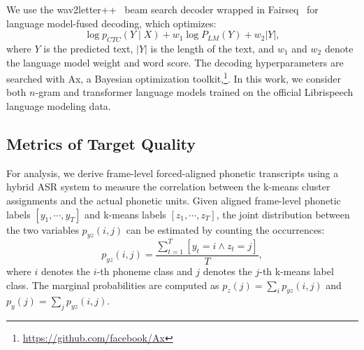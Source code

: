 We use the wav2letter++~\cite{pratap2018wav2letter++} beam search decoder wrapped in Fairseq~\cite{ott2019fairseq} for language model-fused decoding, which optimizes:
\begin{equation}
    \log p_{CTC}(Y \mid X) + w_1 \log P_{LM}(Y) + w_2 |Y|,
\end{equation}
where $Y$ is the predicted text, $|Y|$ is the length of the text, and $w_1$ and $w_2$ denote the language model weight and word score. The decoding hyperparameters are searched with Ax, a Bayesian optimization toolkit,\footnote{\url{https://github.com/facebook/Ax}}. In this work, we consider both $n$-gram and transformer language models trained on the official Librispeech language modeling data.


\subsection{Metrics of Target Quality}
For analysis, we derive frame-level forced-aligned phonetic transcripts using a hybrid ASR system to measure the correlation between the k-means cluster assignments and the actual phonetic units. 
Given aligned frame-level phonetic labels $[y_1, \cdots, y_T]$ and k-means labels $[z_1, \cdots, z_T]$, the joint distribution between the two variables $p_{yz}(i, j)$ can be estimated by counting the occurrences: 
\begin{equation}
    p_{yz}(i, j) = \dfrac{\sum_{t=1}^T [y_t = i \wedge z_t = j] }{T},
\end{equation}
where $i$ denotes the $i$-th phoneme class and $j$ denotes the $j$-th k-means label class.
The marginal probabilities are computed as $p_z(j) = \sum_i p_{yz}(i, j)$ and $p_y(j) = \sum_j p_{yz}(i, j)$.

